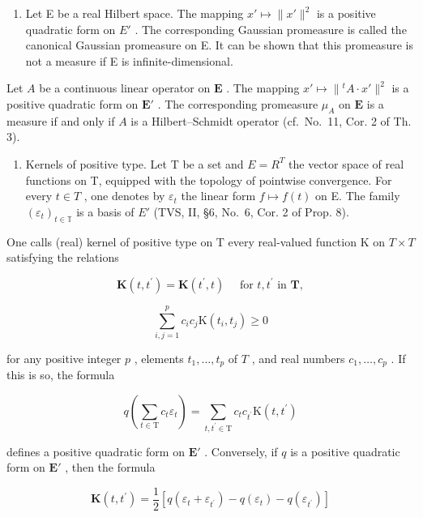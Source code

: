 \begin{enumerate}
\def\labelenumi{\arabic{enumi})}
\tightlist
\item
  Let E be a real Hilbert space. The mapping \(x' \mapsto \|x'\|^2\) is a positive quadratic form on \(E'\) . The corresponding Gaussian promeasure is called the canonical Gaussian promeasure on E. It can be shown that this promeasure is not a measure if E is infinite-dimensional.
\end{enumerate}

Let \(A\) be a continuous linear operator on \(\mathbf{E}\) . The mapping \(x' \mapsto \|{}^{t} A \cdot x'\|^2\) is a positive quadratic form on \(\mathbf{E}'\) . The corresponding promeasure \(\mu_A\) on \(\mathbf{E}\) is a measure if and only if \(A\) is a Hilbert--Schmidt operator (cf.~No.~11, Cor. 2 of Th. 3).

\begin{enumerate}
\def\labelenumi{\arabic{enumi})}
\setcounter{enumi}{1}
\tightlist
\item
  Kernels of positive type. Let T be a set and \(E = R^{T}\) the vector space of real functions on T, equipped with the topology of pointwise convergence. For every \(t \in T\) , one denotes by \(\varepsilon_{t}\) the linear form \(f \mapsto f(t)\) on E. The family \((\varepsilon_{t})_{t \in \mathbb{T}}\) is a basis of \(E'\) (TVS, II, §6, No.~6, Cor. 2 of Prop. 8).
\end{enumerate}

One calls (real) kernel of positive type on T every real-valued function K on \(T \times T\) satisfying the relations

\[
\mathbf {K} (t, t ^ {\prime}) = \mathbf {K} (t ^ {\prime}, t) \quad \text { for } t, t ^ {\prime} \text { in } \mathbf {T},\tag{20}
\]

\[
\sum_ {i, j = 1} ^ {p} c _ {i} c _ {j} \mathrm{K} (t _ {i}, t _ {j}) \geqslant 0\tag{21}
\]

for any positive integer \(p\) , elements \(t_1, \ldots, t_p\) of \(T\) , and real numbers \(c_1, \ldots, c_p\) . If this is so, the formula

\[
q \left(\sum_ {t \in \mathrm{T}} c _ {t} \varepsilon_ {t}\right) = \sum_ {t, t ^ {\prime} \in \mathrm{T}} c _ {t} c _ {t ^ {\prime}} \mathrm{K} (t, t ^ {\prime})\tag{22}
\]

defines a positive quadratic form on \(\mathbf{E}'\) . Conversely, if \(q\) is a positive quadratic form on \(\mathbf{E}'\) , then the formula

\[
\mathbf {K} (t, t ^ {\prime}) = \frac {1}{2} [ q (\varepsilon_ {t} + \varepsilon_ {t ^ {\prime}}) - q (\varepsilon_ {t}) - q (\varepsilon_ {t ^ {\prime}}) ]\tag{23}
\]

